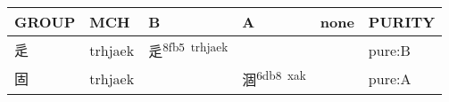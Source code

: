 \documentclass[14pt,a4paper]{scrartcl}
\begin{document}
\begin{longtable}[c]{@{}llllll@{}}
\toprule
\begin{minipage}[b]{0.14\columnwidth}\raggedright\strut
GROUP
\strut\end{minipage} &
\begin{minipage}[b]{0.14\columnwidth}\raggedright\strut
MCH
\strut\end{minipage} &
\begin{minipage}[b]{0.14\columnwidth}\raggedright\strut
B
\strut\end{minipage} &
\begin{minipage}[b]{0.14\columnwidth}\raggedright\strut
A
\strut\end{minipage} &
\begin{minipage}[b]{0.14\columnwidth}\raggedright\strut
none
\strut\end{minipage} &
\begin{minipage}[b]{0.14\columnwidth}\raggedright\strut
PURITY
\strut\end{minipage}\tabularnewline
\midrule
\endhead
\begin{minipage}[t]{0.14\columnwidth}\raggedright\strut
辵
\strut\end{minipage} &
\begin{minipage}[t]{0.14\columnwidth}\raggedright\strut
trhjaek
\strut\end{minipage} &
\begin{minipage}[t]{0.14\columnwidth}\raggedright\strut
辵\textsuperscript{8fb5~trhjaek}
\strut\end{minipage} &
\begin{minipage}[t]{0.14\columnwidth}\raggedright\strut
\strut\end{minipage} &
\begin{minipage}[t]{0.14\columnwidth}\raggedright\strut
\strut\end{minipage} &
\begin{minipage}[t]{0.14\columnwidth}\raggedright\strut
pure:B
\strut\end{minipage}\tabularnewline
\begin{minipage}[t]{0.14\columnwidth}\raggedright\strut
固
\strut\end{minipage} &
\begin{minipage}[t]{0.14\columnwidth}\raggedright\strut
trhjaek
\strut\end{minipage} &
\begin{minipage}[t]{0.14\columnwidth}\raggedright\strut
\strut\end{minipage} &
\begin{minipage}[t]{0.14\columnwidth}\raggedright\strut
涸\textsuperscript{6db8~xak}
\strut\end{minipage} &
\begin{minipage}[t]{0.14\columnwidth}\raggedright\strut
\strut\end{minipage} &
\begin{minipage}[t]{0.14\columnwidth}\raggedright\strut
pure:A
\strut\end{minipage}\tabularnewline
\bottomrule
\end{longtable}
\end{document}
